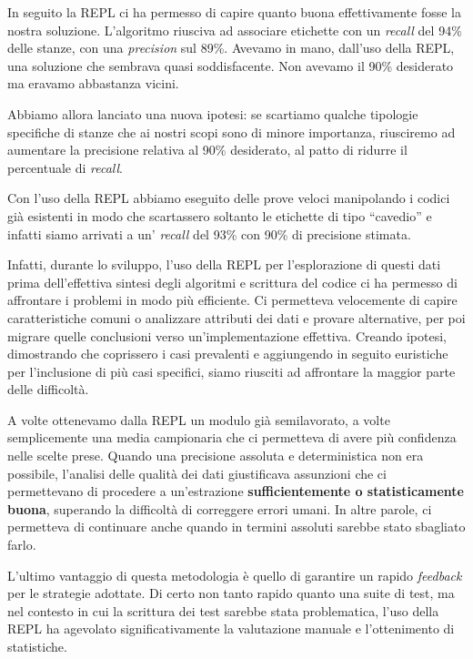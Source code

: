 \documentclass[12pt]{report}
\begin{document}
In seguito la REPL ci ha permesso di capire quanto buona effettivamente fosse
la nostra soluzione. L'algoritmo riusciva ad associare etichette con un
\textit{recall} del 94\% delle stanze, con una \textit{precision} sul 89\%.
Avevamo in mano, dall'uso della REPL, una soluzione che sembrava quasi
soddisfacente. Non avevamo il 90\% desiderato ma eravamo abbastanza vicini. 

Abbiamo allora lanciato una nuova ipotesi: se scartiamo qualche
tipologie specifiche di stanze che ai nostri scopi sono di minore
importanza, riusciremo ad aumentare la precisione relativa al 90\%
desiderato, al patto di ridurre il percentuale di \textit{recall}.

Con l'uso della REPL abbiamo eseguito delle prove veloci manipolando i
codici già esistenti in modo che scartassero soltanto le etichette di
tipo ``cavedio'' e infatti siamo arrivati a un' \textit{recall} del
93\% con 90\% di precisione stimata.

Infatti, durante lo sviluppo, l'uso della REPL per l'esplorazione di
questi dati prima dell'effettiva sintesi degli algoritmi e scrittura
del codice ci ha permesso di affrontare i problemi in modo più
efficiente. Ci permetteva velocemente di capire caratteristiche comuni
o analizzare attributi dei dati e provare alternative, per poi migrare
quelle conclusioni verso un'implementazione effettiva. Creando
ipotesi, dimostrando che coprissero i casi prevalenti e aggiungendo in
seguito euristiche per l'inclusione di più casi specifici, siamo riusciti ad
affrontare la maggior parte delle difficoltà.

A volte ottenevamo dalla REPL un modulo già semilavorato, a volte
semplicemente una media campionaria che ci permetteva di avere più
confidenza nelle scelte prese.
Quando una precisione assoluta e deterministica non era possibile,
l'analisi delle qualità dei dati giustificava assunzioni che ci
permettevano di procedere a un'estrazione \textbf{sufficientemente o
statisticamente buona}, superando la difficoltà di correggere errori
umani. In altre parole, ci permetteva di continuare anche quando in
termini assoluti sarebbe stato sbagliato farlo.

L'ultimo vantaggio di questa metodologia è quello di garantire un
rapido \textit{feedback} per le strategie adottate. Di certo non tanto
rapido quanto una suite di test, ma nel contesto in cui la scrittura
dei test sarebbe stata problematica, l'uso della REPL ha agevolato
significativamente la valutazione manuale e l'ottenimento di statistiche.
\end{document}
